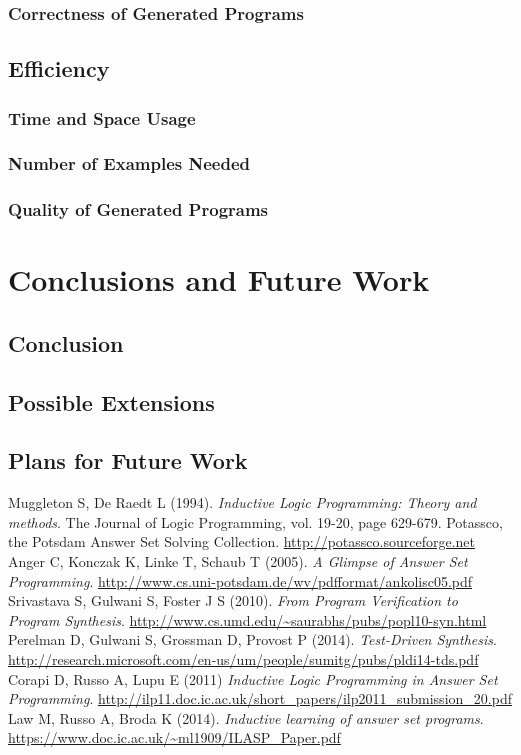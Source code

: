 \documentclass[a4paper,twoside,notitlepage]{article}
\begin{document}
\subsubsection{Correctness of Generated Programs}
\subsection{Efficiency}
\subsubsection{Time and Space Usage}
\subsubsection{Number of Examples Needed}
\subsubsection{Quality of Generated Programs}

\section{Conclusions and Future Work}
\subsection{Conclusion}
\subsection{Possible Extensions}
\subsection{Plans for Future Work}

\clearpage
\begin{thebibliography}{9}
        Muggleton S, De Raedt L (1994).
        \emph{Inductive Logic Programming: Theory and methods}.
        The Journal of Logic Programming, vol. 19-20, page 629-679.
        Potassco, the Potsdam Answer Set Solving Collection. 
        \url{http://potassco.sourceforge.net}
        Anger C, Konczak K, Linke T, Schaub T (2005).
        \emph{A Glimpse of Answer Set Programming}. 
        \url{http://www.cs.uni-potsdam.de/wv/pdfformat/ankolisc05.pdf}
        Srivastava S, Gulwani S, Foster J S (2010).
        \emph{From Program Verification to Program Synthesis}.
        \url{http://www.cs.umd.edu/~saurabhs/pubs/popl10-syn.html}
        Perelman D, Gulwani S, Grossman D, Provost P (2014).
        \emph{Test-Driven Synthesis}.
        \url{http://research.microsoft.com/en-us/um/people/sumitg/pubs/pldi14-tds.pdf}
        Corapi D, Russo A, Lupu E (2011)
        \emph{Inductive Logic Programming in Answer Set Programming}. 
        \url{http://ilp11.doc.ic.ac.uk/short_papers/ilp2011_submission_20.pdf}
        Law M, Russo A, Broda K (2014).
        \emph{Inductive learning of answer set programs}.
        \url{https://www.doc.ic.ac.uk/~ml1909/ILASP_Paper.pdf}
\end{thebibliography}
\end{document}

